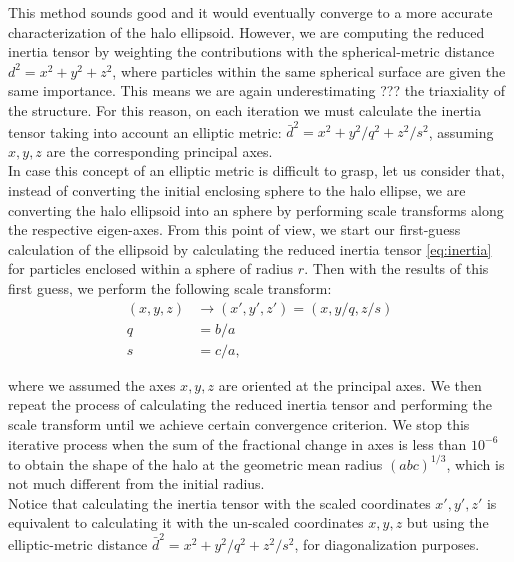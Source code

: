 This method sounds good and it would eventually converge to a more accurate characterization of the halo ellipsoid. However, we are computing the reduced inertia tensor by weighting the contributions with the spherical-metric distance $d^2=x^2+y^2+z^2$, where particles within the same spherical surface are given the same importance. This means we are again underestimating ??? the triaxiality of the structure. For this reason, on each iteration we must calculate the inertia tensor taking into account an elliptic metric: $\bar{d}^2 = x^2+y^2/q^2+z^2/s^2$, assuming $x,y,z$ are the corresponding principal axes.\\

In case this concept of an elliptic metric is difficult to grasp, let us consider that, instead of converting the initial enclosing sphere to the halo ellipse, we are converting the halo ellipsoid into an sphere by performing scale transforms along the respective eigen-axes. From this point of view, we start our first-guess calculation of the ellipsoid by calculating the reduced inertia tensor \eqref{eq:inertia} for particles enclosed within a sphere of radius $r$. Then with the results of this first guess, we perform the following scale transform:\\
  
\begin{align}
(x,y,z) &\rightarrow (x',y',z')=(x,y/q,z/s) \label{eq:scale}\\
q &=  b/a \nonumber \\
s &= c/a \nonumber ,
\end{align}

where we assumed the axes $x,y,z$ are oriented at the principal axes. We then repeat the process of calculating the reduced inertia tensor and performing the scale transform until we achieve certain convergence criterion. We stop this iterative process when the sum of the fractional change in axes is less than $10^{-6}$ to obtain the shape of the halo at the geometric mean radius $(abc)^{1/3}$, which is not much different from the initial radius.\\

Notice that calculating the inertia tensor with the scaled coordinates $x',y',z'$ is equivalent to calculating it with the un-scaled coordinates $x,y,z$ but using the elliptic-metric distance $\bar{d}^2 = x^2+y^2/q^2+z^2/s^2$, for diagonalization purposes.\\

